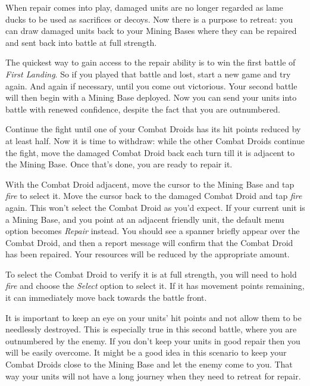 When repair comes into play, damaged units are no longer regarded as lame ducks to be used as sacrifices or decoys. Now there is a purpose to retreat: you can draw damaged units back to your Mining Bases where they can be repaired and sent back into battle at full strength.

The quickest way to gain access to the repair ability is to win the first battle of {\it First Landing}. So if you played that battle and lost, start a new game and try again. And again if necessary, until you come out victorious. Your second battle will then begin with a Mining Base deployed. Now you can send your units into battle with renewed confidence, despite the fact that you are outnumbered.

Continue the fight until one of your Combat Droids has its hit points reduced by at least half. Now it is time to withdraw: while the other Combat Droids continue the fight, move the damaged Combat Droid back each turn till it is adjacent to the Mining Base. Once that's done, you are ready to repair it.

With the Combat Droid adjacent, move the cursor to the Mining Base and tap {\it fire} to select it. Move the cursor back to the damaged Combat Droid and tap {\it fire} again. This won't select the Combat Droid as you'd expect. If your current unit is a Mining Base, and you point at an adjacent friendly unit, the default menu option becomes {\it Repair} instead. You should see a spanner briefly appear over the Combat Droid, and then a report message will confirm that the Combat Droid has been repaired. Your resources will be reduced by the appropriate amount.

To select the Combat Droid to verify it is at full strength, you will need to hold {\it fire} and choose the {\it Select} option to select it. If it has movement points remaining, it can immediately move back towards the battle front.

It is important to keep an eye on your units' hit points and not allow them to be needlessly destroyed. This is especially true in this second battle, where you are outnumbered by the enemy. If you don't keep your units in good repair then you will be easily overcome. It might be a good idea in this scenario to keep your Combat Droids close to the Mining Base and let the enemy come to you. That way your units will not have a long journey when they need to retreat for repair.

